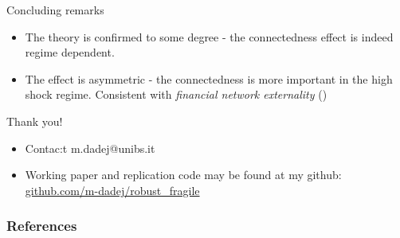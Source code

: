 \documentclass{beamer}
\begin{document}
\begin{frame}{Concluding remarks}
\begin{itemize}
  \item<1-> The theory is confirmed to some degree - the connectedness effect is indeed regime dependent.
  \item<2-> The effect is asymmetric - the connectedness is more important in the high shock regime. Consistent with \textit{financial network externality} (\cite{acemoglu15})
\end{itemize}
\end{frame}

\begin{frame}
	Thank you!
	
	\begin{itemize}
		\item Contac:t m.dadej@unibs.it
		\item Working paper and replication code may be found at my github: \url{github.com/m-dadej/robust\_fragile}
	\end{itemize}
\end{frame}


\begin{frame}[allowframebreaks]
\frametitle{References}
  \printbibliography
\end{frame}
\end{document}
